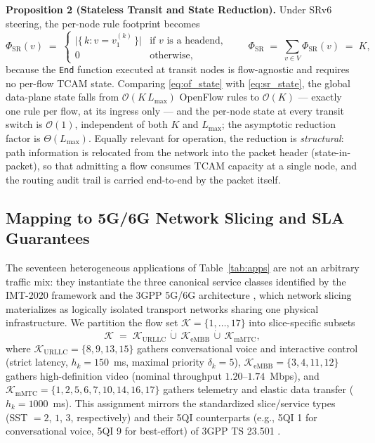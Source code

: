 \noindent\textbf{Proposition 2 (Stateless Transit and State Reduction).}
Under SRv6 steering, the per-node rule footprint becomes
\begin{equation}
\Phi_{\mathrm{SR}}(v) \;=\;
\begin{cases}
\bigl|\{\,k : v = v^{(k)}_1\,\}\bigr| & \text{if $v$ is a headend},\\[2pt]
0 & \text{otherwise},
\end{cases}
\qquad
\Phi_{\mathrm{SR}} \;=\; \sum_{v\in V}\Phi_{\mathrm{SR}}(v) \;=\; K,
\label{eq:sr_state}
\end{equation}
because the \texttt{End} function executed at transit nodes is flow-agnostic
and requires no per-flow TCAM state. Comparing \eqref{eq:of_state} with
\eqref{eq:sr_state}, the global data-plane state falls from
$\mathcal{O}(K\,L_{\max})$ OpenFlow rules to $\mathcal{O}(K)$ --- exactly one
rule per flow, at its ingress only --- and the per-node state at every transit
switch is $\mathcal{O}(1)$, independent of both $K$ and $L_{\max}$; the
asymptotic reduction factor is $\Theta(L_{\max})$. Equally relevant for
operation, the reduction is \emph{structural}: path information is relocated
from the network into the packet header (state-in-packet), so that admitting a
flow consumes TCAM capacity at a single node, and the routing audit trail is
carried end-to-end by the packet itself.

\subsection{Mapping to 5G/6G Network Slicing and SLA Guarantees}
\label{subsec:slicing}

The seventeen heterogeneous applications of Table~\ref{tab:apps} are not an
arbitrary traffic mix: they instantiate the three canonical service classes
identified by the IMT-2020 framework \cite{itu-m2083} and the 3GPP 5G/6G
architecture \cite{3gpp-ts23501}, which network slicing materializes as
logically isolated transport networks sharing one physical infrastructure. We
partition the flow set $\mathcal{K} = \{1,\ldots,17\}$ into slice-specific
subsets
\begin{equation}
\mathcal{K} \;=\;
\mathcal{K}_{\mathrm{URLLC}} \,\dot{\cup}\,
\mathcal{K}_{\mathrm{eMBB}} \,\dot{\cup}\,
\mathcal{K}_{\mathrm{mMTC}},
\label{eq:slicepartition}
\end{equation}
where $\mathcal{K}_{\mathrm{URLLC}} = \{8, 9, 13, 15\}$ gathers conversational
voice and interactive control (strict latency, $h_k = 150$~ms, maximal
priority $\delta_k = 5$), $\mathcal{K}_{\mathrm{eMBB}} = \{3, 4, 11, 12\}$
gathers high-definition video (nominal throughput $1.20$--$1.74$~Mbps), and
$\mathcal{K}_{\mathrm{mMTC}} = \{1, 2, 5, 6, 7, 10, 14, 16, 17\}$ gathers
telemetry and elastic data transfer ($h_k = 1000$~ms). This assignment mirrors
the standardized slice/service types (SST $= 2$, $1$, $3$, respectively) and
their 5QI counterparts (e.g., 5QI 1 for conversational voice, 5QI 9 for
best-effort) of 3GPP TS 23.501 \cite{3gpp-ts23501}.

